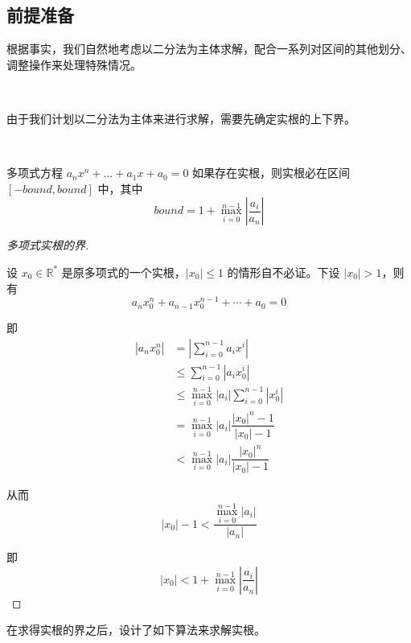 \subsection{前提准备}

根据事实，我们自然地考虑以二分法为主体求解，配合一系列对区间的其他划分、调整操作来处理特殊情况。

\begin{problem}[对可能存在的实根作界的估计]~
	
	由于我们计划以二分法为主体来进行求解，需要先确定实根的上下界。
	
	
\end{problem}

\begin{theorem}[多项式实根的界]~
	
	多项式方程 $a_nx^n+\dots+a_1x+a_0 = 0$ 如果存在实根，则实根必在区间 $[-bound, bound]$ 中，其中
	$$
	bound = 1 + \max_{i = 0}^{n - 1} \left|\frac{a_i}{a_n}\right|
	$$
	
\end{theorem}

\begin{proof}[多项式实根的界]~
	
	设 $x_0 \in \mathbb{R}^*$ 是原多项式的一个实根，$|x_0| \le 1$ 的情形自不必证。下设 $|x_0| > 1$，则有
	$$
	a_nx_0^n + a_{n - 1}x_0^{n - 1} + \cdots + a_0 = 0
	$$
	
	即
	$$
	\begin{aligned}
	|a_nx_0^n| & = \left|\sum_{i = 0}^{n - 1} a_ix^i\right| \\
	& \le \sum_{i = 0}^{n - 1} |a_ix_0^i| \\
	& \le \max_{i = 0}^{n - 1} |a_i| \sum_{i = 0}^{n - 1}|x_0^i| \\
	& = \max_{i = 0}^{n - 1} |a_i| \dfrac{|x_0|^n - 1}{|x_0| - 1} \\
	& < \max_{i = 0}^{n - 1} |a_i| \dfrac{|x_0|^n}{|x_0| - 1}
	\end{aligned}
	$$
	
	从而
	$$
	|x_0| - 1 < \dfrac{\max_{i = 0}^{n - 1} |a_i|}{|a_n|}
	$$
	
	即
	$$
	|x_0| < 1 + \max_{i = 0}^{n - 1} \left|\frac{a_i}{a_n}\right|
	$$
	\qedhere
	
	
\end{proof}

在求得实根的界之后，设计了如下算法来求解实根。

